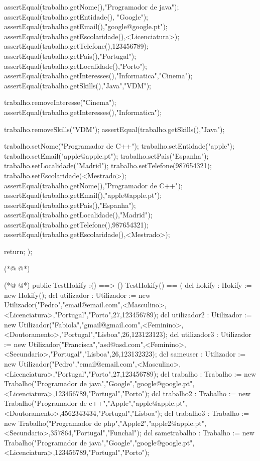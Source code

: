 \begin{vdmpp}[breaklines=true]
 assertEqual(trabalho.getNome(),"Programador de java");
 assertEqual(trabalho.getEntidade(), "Google");
 assertEqual(trabalho.getEmail(),"google@google.pt");
 assertEqual(trabalho.getEscolaridade(),<Licenciatura>);
 assertEqual(trabalho.getTelefone(),123456789);
 assertEqual(trabalho.getPais(),"Portugal");
 assertEqual(trabalho.getLocalidade(),"Porto");
 assertEqual(trabalho.getInteresses(),{"Informatica","Cinema"});
 assertEqual(trabalho.getSkills(),{"Java","VDM"});
 
 trabalho.removeInteresse("Cinema");
 assertEqual(trabalho.getInteresses(),{"Informatica"});
 
 trabalho.removeSkills("VDM");
 assertEqual(trabalho.getSkills(),{"Java"});
 
 trabalho.setNome("Programador de C++");
 trabalho.setEntidade("apple");
 trabalho.setEmail("apple@apple.pt");
 trabalho.setPais("Espanha");
 trabalho.setLocalidade("Madrid");
 trabalho.setTelefone(987654321);
 trabalho.setEscolaridade(<Mestrado>);
 assertEqual(trabalho.getNome(),"Programador de C++");
 assertEqual(trabalho.getEmail(),"apple@apple.pt");
 assertEqual(trabalho.getPais(),"Espanha");
 assertEqual(trabalho.getLocalidade(),"Madrid");
 assertEqual(trabalho.getTelefone(),987654321);
 assertEqual(trabalho.getEscolaridade(),<Mestrado>);

 return;
);

(*@
\label{main:101}
@*)

(*@
\label{TestHokify:102}
@*)
public TestHokify :() ==> ()
TestHokify() ==
(
 dcl hokify : Hokify := new Hokify();
 dcl utilizador : Utilizador := new Utilizador("Pedro","email@email.com",<Masculino>,<Licenciatura>,"Portugal","Porto",27,123456789);
 dcl utilizador2 : Utilizador := new Utilizador("Fabiola","gmail@gmail.com",<Feminino>,<Doutoramento>,"Portugal","Lisboa",26,123123123);
 dcl utilizador3 : Utilizador := new Utilizador("Francisca","asd@asd.com",<Feminino>,<Secundario>,"Portugal","Lisboa",26,123132323);
 dcl sameuser : Utilizador := new Utilizador("Pedro","email@email.com",<Masculino>,<Licenciatura>,"Portugal","Porto",27,123456789);
 dcl trabalho : Trabalho := new Trabalho("Programador de java","Google","google@google.pt",<Licenciatura>,123456789,"Portugal","Porto");
 dcl trabalho2 : Trabalho := new Trabalho("Programador de c++","Apple","apple@apple.pt",<Doutoramento>,4562343434,"Portugal","Lisboa");
 dcl trabalho3 : Trabalho := new Trabalho("Programador de php","Apple2","apple2@apple.pt",<Secundario>,357864,"Portugal","Funchal");
 dcl sametrabalho : Trabalho := new Trabalho("Programador de java","Google","google@google.pt",<Licenciatura>,123456789,"Portugal","Porto");
 

\end{vdmpp}
